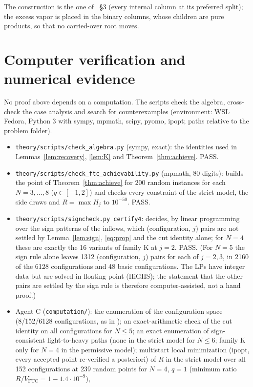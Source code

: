 \documentclass[11pt,a4paper]{report}
\newcommand{\VFTC}{V_{\mathrm{FTC}}}
\begin{document}
\noindent The construction is the one of~\autocite{HS3} \S3 (every internal column at its preferred split); the
excess vapor is placed in the binary columns, whose children are pure products, so that no carried-over root moves.

\section{Computer verification and numerical evidence}\label{sec:computer}

No proof above depends on a computation. The scripts check the algebra, cross-check the case analysis and search
for counterexamples (environment: WSL Fedora, Python 3 with sympy, mpmath, scipy, pyomo, ipopt; paths relative to
the problem folder).
\begin{itemize}
\item \texttt{theory/scripts/check\_algebra.py} (sympy, exact): the identities used in Lemmas~\ref{lem:recovery},
\ref{lem:K} and Theorem~\ref{thm:achieve}. PASS.
\item \texttt{theory/scripts/check\_ftc\_achievability.py} (mpmath, 80 digits): builds the point of
Theorem~\ref{thm:achieve} for 200 random instances for each $N=3,\dots,8$ ($q\in[-1,2]$) and checks every constraint of
the strict model, the side draws and $R=\max H_j$ to $10^{-50}$. PASS.
\item \texttt{theory/scripts/signcheck.py certify4}: decides, by linear programming over the sign patterns of the
inflows, which (configuration, $j$) pairs are not settled by Lemma~\ref{lem:sign}, \eqref{eq:prop} and the cut identity
alone; for $N=4$ these are exactly the 16 variants of family K at $j=2$. PASS. (For $N=5$ the sign rule alone leaves
1312 (configuration, $j$) pairs for each of $j=2,3$, in 2160 of the 6128 configurations and 48 basic configurations.
The LPs have integer data but are solved in floating point (HiGHS); the statement that the other pairs are
settled by the sign rule is therefore computer-assisted, not a hand proof.)
\item Agent C (\texttt{computation/}): the enumeration of the configuration space (8/152/6128 configurations, as in
\autocite{SA10}); an exact-arithmetic check of the cut identity on all configurations for $N\le5$; an exact enumeration of
sign-consistent light-to-heavy paths (none in the strict model for $N\le6$; family K only for $N=4$ in the permissive
model); multistart local minimization (ipopt, every accepted point re-verified a posteriori) of $R$ in the strict
model over all 152 configurations at 239 random points for $N=4$, $q=1$ (minimum ratio $R/\VFTC=1-1.4\cdot10^{-9}$),

\end{itemize}
\end{document}
